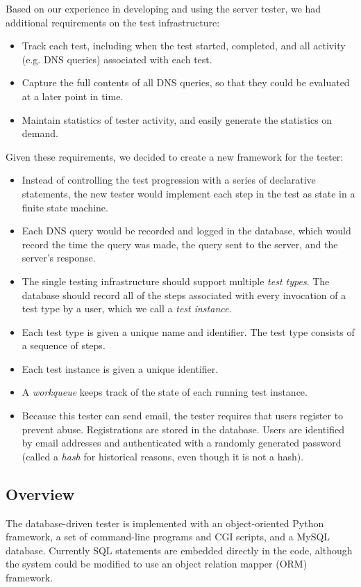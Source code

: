 \documentclass[preprint,3p]{elsarticle}
\begin{document}
\noindent Based on our experience in developing and using the server tester, we
had additional requirements on the test infrastructure:

\begin{itemize}
\item Track each test, including when the test started, completed, and
  all activity (e.g. DNS queries) associated with each test.
\item Capture the full contents of all DNS queries, so that they could
  be evaluated at a later point in time.
\item Maintain statistics of tester activity, and easily generate the
  statistics on demand.
\end{itemize}

\noindent Given these requirements, we decided to create a new framework for the
tester:

\begin{itemize}
\item Instead of controlling the test progression with a series of
  declarative statements, the new tester would implement each
  step in the test as state in a finite state machine. 
\item Each DNS query would be recorded and logged in the database,
  which would record the time the query was made, the query sent to
  the server, and the server's response. 
\item The single testing infrastructure should support multiple \emph{test
  types}. The database should record all of the steps associated with
  every invocation of a test type by a user, which we call a
  \emph{test instance}.
\item Each test type is given a unique name and identifier. The test type
  consists of a sequence of steps.
\item Each test instance is given a unique identifier. 
\item A \emph{workqueue} keeps track of the state of each running test instance.
\item Because this tester can send email, the tester requires that
  users register to prevent abuse. Registrations are stored in the
  database. Users are identified by email addresses and authenticated
  with a randomly generated password (called a \emph{hash} for
  historical reasons, even though it is not a hash). 
\end{itemize}

\subsection{Overview}
The database-driven tester is implemented with an object-oriented
Python framework, a set of command-line programs and CGI scripts, and
a MySQL database. Currently SQL statements are embedded directly in
the code, although the system could be modified to use an object
relation mapper (ORM) framework. 
\end{document}
